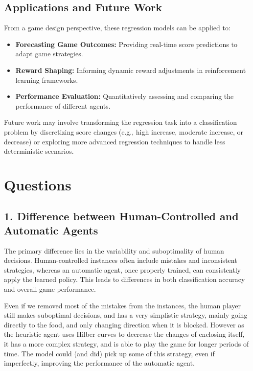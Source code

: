 \documentclass[12pt,a4paper]{article}
\begin{document}
\subsection{Applications and Future Work}
From a game design perspective, these regression models can be applied to:
\begin{itemize}
    \item \textbf{Forecasting Game Outcomes:} Providing real-time score predictions to adapt game strategies.
    \item \textbf{Reward Shaping:} Informing dynamic reward adjustments in reinforcement learning frameworks.
    \item \textbf{Performance Evaluation:} Quantitatively assessing and comparing the performance of different agents.
\end{itemize}
Future work may involve transforming the regression task into a classification problem by discretizing score changes (e.g., high increase, moderate increase, or decrease) or exploring more advanced regression techniques to handle less deterministic scenarios.



\section{Questions}
\subsection*{1. Difference between Human-Controlled and Automatic Agents}
The primary difference lies in the variability and suboptimality of human decisions. 
Human-controlled instances often include mistakes and inconsistent strategies, whereas an automatic agent, once properly trained, can consistently apply the learned policy. 
This leads to differences in both classification accuracy and overall game performance.

Even if we removed most of the mistakes from the instances, the human player still makes suboptimal decisions,
and has a very simplistic strategy, mainly going directly to the food, and only changing direction when it is blocked.
However as the heuristic agent uses Hilber curves to decrease the changes of enclosing itself, it has a more complex strategy, and is able to play the game for longer periods of time.
The model could (and did) pick up some of this strategy, even if imperfectly, improving the performance of the automatic agent.
\end{document}
